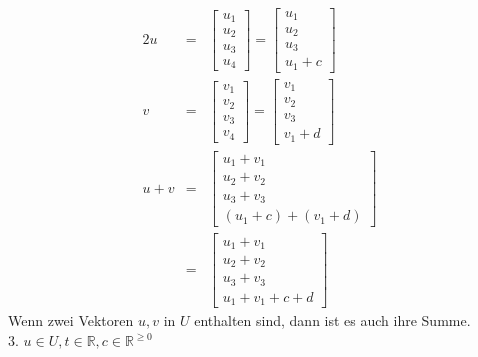 \documentclass[10pt,a4paper,oneside,ngerman,numbers=noenddot]{scrartcl}
\begin{document}
\begin{alignat*}{2}
u &=& \begin{bmatrix}
u_{1} \\
u_{2} \\
u_{3} \\
u_{4}
\end{bmatrix} = 
\begin{bmatrix}
u_{1} \\
u_{2} \\
u_{3} \\
u_{1} + c
\end{bmatrix} \\
v &=& \begin{bmatrix}
v_{1} \\
v_{2} \\
v_{3} \\
v_{4}
\end{bmatrix} =
\begin{bmatrix}
v_{1} \\
v_{2} \\
v_{3} \\
v_{1} + d
\end{bmatrix} \\
u + v &=& \begin{bmatrix}
u_{1} + v_{1} \\
u_{2} + v_{2} \\
u_{3} + v_{3} \\
(u_{1} + c) + (v_{1} + d)
\end{bmatrix} \\
&=& \begin{bmatrix}
u_{1} + v_{1} \\
u_{2} + v_{2} \\
u_{3} + v_{3} \\
u_{1} + v_{1} + c + d
\end{bmatrix}
\end{alignat*}
Wenn zwei Vektoren $u,v$ in $U$ enthalten sind, dann ist es auch ihre Summe.\\
3. $u \in U, t \in \mathbb{R}, c \in \mathbb{R}^{\geq 0}$
\end{document}
